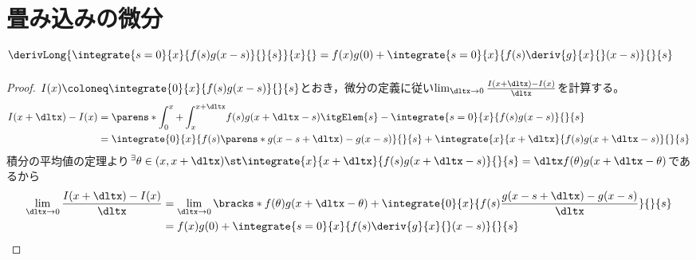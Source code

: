     \section{
        畳み込みの微分\texorpdfstring{\\}{}
        \texorpdfstring{$\derivLong{\integrate{s=0}{x}{f(s)g(x-s)}{}{s}}{x}{} = f(x)g(0) + \integrate{s=0}{x}{f(s)\deriv{g}{x}{}(x-s)}{}{s}$}{}
    }
        \begin{proof}
            $I(x) \coloneq \integrate{0}{x}{f(s)g(x-s)}{}{s}$とおき，微分の定義に従い$\lim_{\dltx\to 0}\frac{I(x+\dltx)-I(x)}{\dltx}$を計算する。
            \begin{align*}
                I(x+\dltx)-I(x) &= \parens*{\int_{0}^{x}+\int_{x}^{x+\dltx}}f(s)g(x+\dltx-s)\itgElem{s} - \integrate{s=0}{x}{f(s)g(x-s)}{}{s} \\
                &= \integrate{0}{x}{f(s)\parens*{g(x-s+\dltx)-g(x-s)}}{}{s} + \integrate{x}{x+\dltx}{f(s)g(x+\dltx-s)}{}{s}
            \end{align*}
            積分の平均値の定理より$^\exists\theta\in(x,x+\dltx)\st\integrate{x}{x+\dltx}{f(s)g(x+\dltx-s)}{}{s} = \dltx f(\theta)g(x+\dltx-\theta)$であるから
            \begin{align*}
                \lim_{\dltx\to 0}\frac{I(x+\dltx)-I(x)}{\dltx} &= \lim_{\dltx\to 0}\bracks*{f(\theta)g(x+\dltx-\theta) + \integrate{0}{x}{f(s)\frac{g(x-s+\dltx)-g(x-s)}{\dltx}}{}{s}} \\
                &= f(x)g(0) + \integrate{s=0}{x}{f(s)\deriv{g}{x}{}(x-s)}{}{s}
            \end{align*}
        \end{proof}
